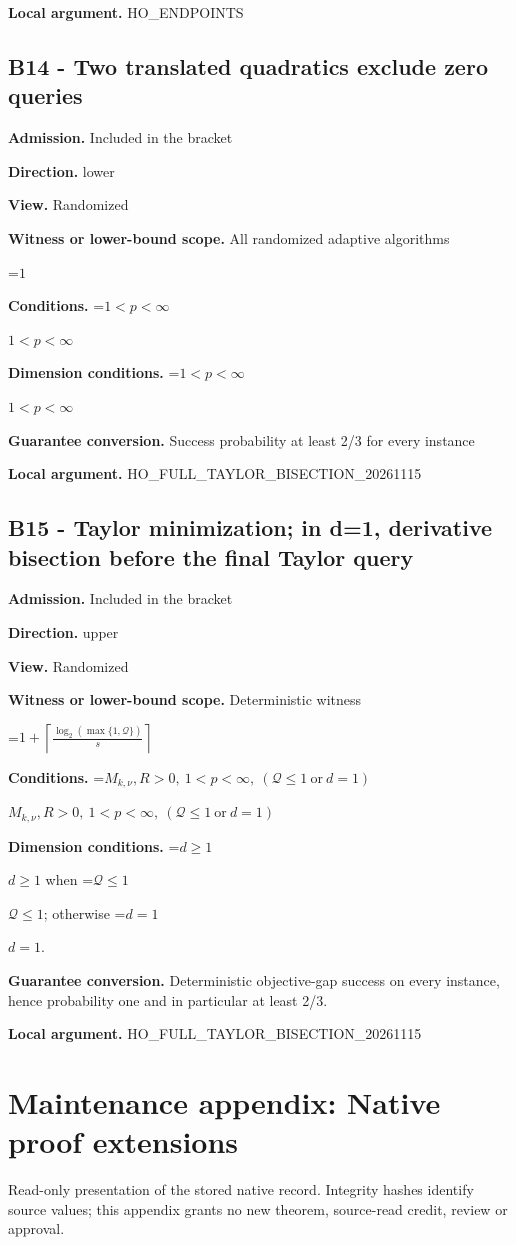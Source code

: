 \documentclass[10pt,a4paper]{article}
\newcommand{\AtlasMath}[1]{\par\begingroup\centering\setbox0=\hbox{$\displaystyle #1$}\ifdim\wd0>1.4\linewidth\typeout{ATLAS WIDE FORMULA: \the\wd0}\fi\ifdim\wd0>\linewidth\resizebox{\linewidth}{!}{\box0}\else\box0\fi\par\endgroup}
\newcommand{\AtlasInlineMath}[1]{\begingroup\setbox0=\hbox{$#1$}\ifdim\wd0>.4\linewidth\endgroup\AtlasMath{#1}\else\endgroup$#1$\fi}
\begin{document}
\textbf{Local argument.} HO\_\allowbreak{}ENDPOINTS

\subsection{B14 - Two translated quadratics exclude zero queries}
\textbf{Admission.} Included in the bracket

\textbf{Direction.} lower

\textbf{View.} Randomized

\textbf{Witness or lower-bound scope.} All randomized adaptive algorithms

\AtlasMath{1}
\textbf{Conditions.} \AtlasInlineMath{1<p<\infty}

\textbf{Dimension conditions.} \AtlasInlineMath{1<p<\infty}

\textbf{Guarantee conversion.} Success probability at least 2/3 for every instance

\textbf{Local argument.} HO\_\allowbreak{}FULL\_\allowbreak{}TAYLOR\_\allowbreak{}BISECTION\_\allowbreak{}20261115

\subsection{B15 - Taylor minimization; in d=1, derivative bisection before the final Taylor query}
\textbf{Admission.} Included in the bracket

\textbf{Direction.} upper

\textbf{View.} Randomized

\textbf{Witness or lower-bound scope.} Deterministic witness

\AtlasMath{1+\left\lceil\frac{\log_2(\max\{1,\mathcal{Q}\})}{s}\right\rceil}
\textbf{Conditions.} \AtlasInlineMath{M_{k,\nu},R>0,\ 1<p<\infty,\ (\mathcal{Q}\le1\ \mathrm{or}\ d=1)}

\textbf{Dimension conditions.} \AtlasInlineMath{d\ge1} when \AtlasInlineMath{\mathcal{Q}\le1}; otherwise \AtlasInlineMath{d=1}.

\textbf{Guarantee conversion.} Deterministic objective-gap success on every instance, hence probability one and in particular at least 2/3.

\textbf{Local argument.} HO\_\allowbreak{}FULL\_\allowbreak{}TAYLOR\_\allowbreak{}BISECTION\_\allowbreak{}20261115

\section{Maintenance appendix: Native proof extensions}
Read-only presentation of the stored native record. Integrity hashes identify source values; this appendix grants no new theorem, source-read credit, review or approval.
\end{document}

